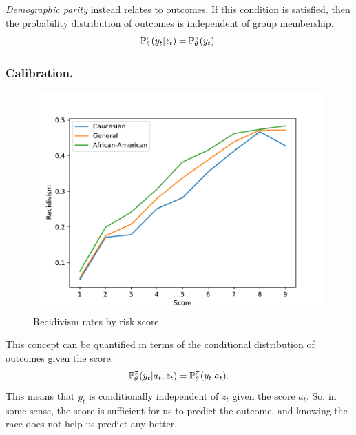 \begin{frame}
{    \emph{Demographic parity} instead relates to outcomes. If this
    condition is satisfied, then the probability distribution of
    outcomes is independent of group membership.
    \begin{equation}
      \label{eq:eqality-outcomes}
      \mathop{\mbox{\ensuremath{\mathbb{P}}}}\nolimits_\theta^\pi(y_t | z_t) =       \mathop{\mbox{\ensuremath{\mathbb{P}}}}\nolimits_\theta^\pi(y_t ).
    \end{equation}

  }
\end{frame}

\begin{frame}
  \frametitle{Calibration.}
  
  \begin{figure}[H]
    \centering
    \includegraphics[width=\columnwidth]{../figures/calibration-compas}
    \caption{Recidivism rates by risk score.}
    \label{fig:imrs}
  \end{figure}
  This concept can be quantified in terms of the conditional distribution of outcomes given the score:
  \begin{equation}
    \mathop{\mbox{\ensuremath{\mathbb{P}}}}\nolimits_\theta^\pi(y_t | a_t, z_t) =       \mathop{\mbox{\ensuremath{\mathbb{P}}}}\nolimits_\theta^\pi(y_t | a_t).
    \label{eq:calibration}
  \end{equation}
  This means that $y_t$ is conditionally independent of $z_t$ given
  the score $a_t$. So, in some sense, the score is sufficient for us
  to predict the outcome, and knowing the race does not help us
  predict any better.  
\end{frame}

